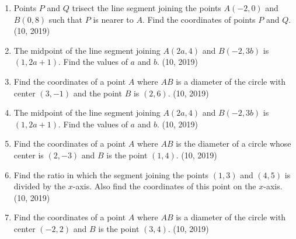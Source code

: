 \begin{enumerate}[label=\thesubsection.\arabic*,ref=\thesubsection.\theenumi]
\item Points $P$ and $Q$ trisect the line segment joining the points $A(-2, 0)$ and $B(0, 8)$ such that $P$ is nearer to $A$. Find the coordinates of points $P$ and $Q$. \hfill (10, 2019)
\item The midpoint of the line segment joining $A(2a, 4)$ and $B(-2, 3b)$ is $(1, 2a + 1)$. Find the values of $a$ and $b$. \hfill (10, 2019)
\item Find the coordinates of a point $A$ where $AB$ is a diameter of the circle with center $(3, -1)$ and the point $B$ is $(2, 6)$. \hfill (10, 2019)
\item The midpoint of the line segment joining $A(2a, 4)$ and $B(-2, 3b)$ is $(1, 2a + 1)$. Find the values of $a$ and $b$. \hfill (10, 2019)
\item Find the coordinates of a point $A$ where $AB$ is the diameter of a circle whose center is $(2, -3)$ and $B$ is the point $(1, 4)$. \hfill (10, 2019)
\item Find the ratio in which the segment joining the points $(1, 3)$ and $(4, 5)$ is divided by the $x$-axis. Also find the coordinates of this point on the $x$-axis. \hfill (10, 2019)
\item Find the coordinates of a point $A$ where $AB$ is a diameter of the circle with center $(-2, 2)$ and $B$ is the point $(3, 4)$. \hfill (10, 2019)

\end{enumerate}
